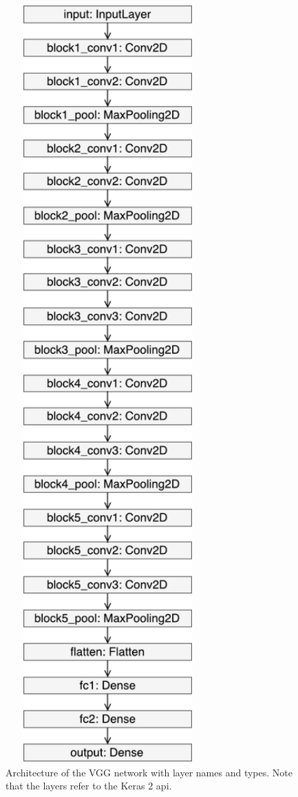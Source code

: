 \begin{figure}
\begin{minipage}{0.4\textwidth}
            \includegraphics[width=0.7\textwidth]{fig/vgg_keras.pdf}
            \caption{Architecture of the VGG network with layer names and types. Note that the layers refer to the Keras 2 \acrshort{api}.}
            \label{fig:vgg-architecture}
    \end{minipage}
\end{figure}

